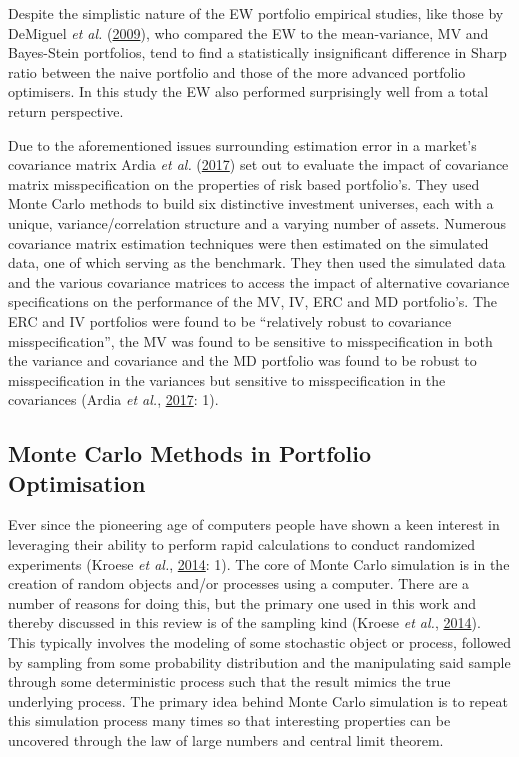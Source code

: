 \documentclass[11pt,preprint, authoryear]{elsarticle}
\numberwithin{equation}{section}
\numberwithin{figure}{section}
\numberwithin{table}{section}
\begin{document}
Despite the simplistic nature of the EW portfolio empirical studies,
like those by DeMiguel \emph{et al.}
(\protect\hyperlink{ref-demiguel2009}{2009}), who compared the EW to the
mean-variance, MV and Bayes-Stein portfolios, tend to find a
statistically insignificant difference in Sharp ratio between the naive
portfolio and those of the more advanced portfolio optimisers. In this
study the EW also performed surprisingly well from a total return
perspective.

Due to the aforementioned issues surrounding estimation error in a
market's covariance matrix Ardia \emph{et al.}
(\protect\hyperlink{ref-ardia2017}{2017}) set out to evaluate the impact
of covariance matrix misspecification on the properties of risk based
portfolio's. They used Monte Carlo methods to build six distinctive
investment universes, each with a unique, variance/correlation structure
and a varying number of assets. Numerous covariance matrix estimation
techniques were then estimated on the simulated data, one of which
serving as the benchmark. They then used the simulated data and the
various covariance matrices to access the impact of alternative
covariance specifications on the performance of the MV, IV, ERC and MD
portfolio's. The ERC and IV portfolios were found to be ``relatively
robust to covariance misspecification'', the MV was found to be
sensitive to misspecification in both the variance and covariance and
the MD portfolio was found to be robust to misspecification in the
variances but sensitive to misspecification in the covariances (Ardia
\emph{et al.}, \protect\hyperlink{ref-ardia2017}{2017}: 1).

\hypertarget{monte-carlo-methods-in-portfolio-optimisation}{%
\subsection{Monte Carlo Methods in Portfolio
Optimisation}\label{monte-carlo-methods-in-portfolio-optimisation}}

Ever since the pioneering age of computers people have shown a keen
interest in leveraging their ability to perform rapid calculations to
conduct randomized experiments (Kroese \emph{et al.},
\protect\hyperlink{ref-kroese2014}{2014}: 1). The core of Monte Carlo
simulation is in the creation of random objects and/or processes using a
computer. There are a number of reasons for doing this, but the primary
one used in this work and thereby discussed in this review is of the
sampling kind (Kroese \emph{et al.},
\protect\hyperlink{ref-kroese2014}{2014}). This typically involves the
modeling of some stochastic object or process, followed by sampling from
some probability distribution and the manipulating said sample through
some deterministic process such that the result mimics the true
underlying process. The primary idea behind Monte Carlo simulation is to
repeat this simulation process many times so that interesting properties
can be uncovered through the law of large numbers and central limit
theorem.
\end{document}
